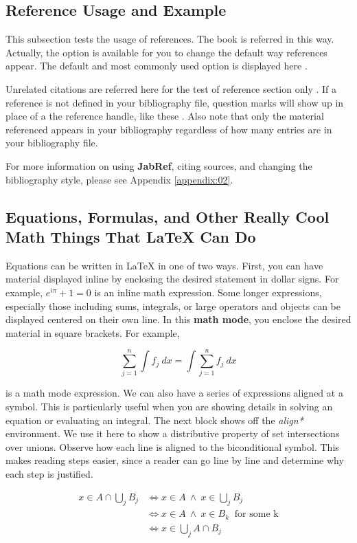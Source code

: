 \subsection{Reference Usage and Example}

This subsection tests the usage of references. The book \cite{REALCAR} 
is referred in this way. Actually, the option is available for you to change the default way references appear. The default and most commonly used option \cite{einstein} is displayed here \cite{Barn-JORVQ}.

Unrelated citations are referred here for the test of reference section only \cite{TAMU}. If a reference is not defined in your bibliography file, question marks will show up in place of a the reference handle, like these \cite{Over9000}. Also note that only the material referenced appears in your bibliography regardless of how many entries are in your bibliography file.

For more information on using \textbf{JabRef}, citing sources, and changing the bibliography style, please see Appendix \ref{appendix:02}.

\subsection{Equations, Formulas, and Other Really Cool Math Things That \LaTeX{} Can Do}

Equations can be written in \LaTeX{} in one of two ways. First, you can have material displayed inline by enclosing the desired statement in dollar signs. For example, $e^{i\pi}+1=0$ is an inline math expression. Some longer expressions, especially those including sums, integrals, or large operators and objects can be displayed centered on their own line. In this \textbf{math mode}, you enclose the desired material in square brackets. For example,

\[ \sum_{j = 1} ^n \int f_j \ dx = \int \sum_{j = 1} ^n f_j \ dx \]

is a math mode expression. We can also have a series of expressions aligned at a symbol. This is particularly useful when you are showing details in solving an equation or evaluating an integral. The next block shows off the \textit{align*} environment. We use it here to show a distributive property of set intersections over unions. Observe how each line is aligned to the biconditional symbol. This makes reading steps easier, since a reader can go line by line and determine why each step is justified.

\begin{align*}
x \in A \cap \bigcup_{j} B_j &\iff x \in A \ \wedge \ x \in \bigcup_{j} B_j \\
&\iff x \in A \ \wedge \ x \in B_k \ \text{ for some k} \\
&\iff x \in \bigcup_{j} A \cap B_j
\end{align*}

